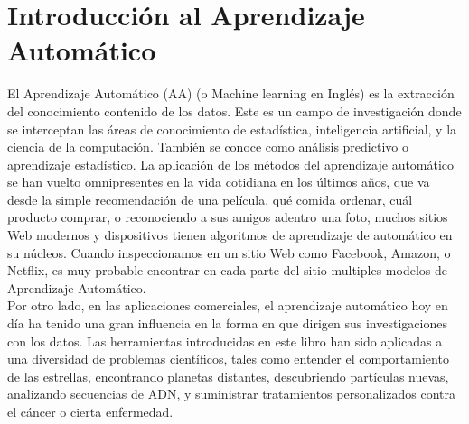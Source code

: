 



























%

	\chapter{Introducción al Aprendizaje Automático}{\label{Cap1}}	



El Aprendizaje Automático (AA) (o Machine learning en Inglés) es la extracción del conocimiento contenido de los datos.  Este es un campo de investigación donde se interceptan las áreas de conocimiento de estadística, inteligencia artificial, y la ciencia de la computación. También se conoce como análisis predictivo o aprendizaje estadístico. La aplicación de los métodos del aprendizaje automático  se han vuelto omnipresentes   en la vida cotidiana en los últimos años, que va desde la simple recomendación de una película,  qué comida ordenar,  cuál  producto comprar,  o reconociendo a sus amigos adentro una foto, muchos sitios Web modernos y dispositivos tienen algoritmos de aprendizaje de automático  en su núcleos. Cuando inspeccionamos en un sitio Web como Facebook, Amazon, o Netflix, es muy probable encontrar  en cada parte del sitio multiples modelos de Aprendizaje Automático. \\

  
Por otro lado, en las aplicaciones comerciales, el aprendizaje automático hoy en día ha tenido una gran influencia  en la forma en que dirigen sus investigaciones con los datos. Las herramientas introducidas en este libro han sido aplicadas a una diversidad de problemas científicos, tales  como entender el comportamiento de las estrellas, encontrando planetas distantes, descubriendo partículas nuevas, analizando secuencias de ADN, y  suministrar tratamientos personalizados contra el cáncer o cierta enfermedad.\\

